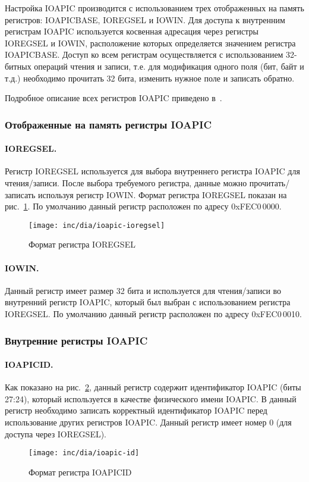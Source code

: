 Настройка IOAPIC производится с использованием трех отображенных на память регистров:
IOAPICBASE, IOREGSEL и IOWIN. Для доступа к внутренним регистрам IOAPIC используется косвенная
адресация через регистры IOREGSEL и IOWIN, расположение которых определяется значением
регистра IOAPICBASE. Доступ ко всем регистрам осуществляется с использованием 32-битных
операций чтения и записи, т.е. для модификация одного поля (бит, байт и т.д.) необходимо
прочитать 32 бита, изменить нужное поле и записать обратно.

Подробное описание всех регистров IOAPIC приведено в~\cite{ioapic}.

\subsubsection*{Отображенные на память регистры IOAPIC}
\paragraph{IOREGSEL.} Регистр IOREGSEL используется для выбора внутреннего регистра IOAPIC для чтения/записи.
После выбора требуемого регистра, данные можно прочитать/записать используя регистр IOWIN. Формат регистра
IOREGSEL показан на рис.~\ref{fig:ioapic-ioregsel}. По умолчанию данный регистр расположен по адресу 0xFEC0\,0000.
\begin{figure}[ht!]
  \centering
  \texttt{[image: inc/dia/ioapic-ioregsel]}
  \caption{Формат регистра IOREGSEL}
  \label{fig:ioapic-ioregsel}
\end{figure}

\paragraph{IOWIN.} Данный регистр имеет размер 32 бита и используется для чтения/записи во
внутренний регистр IOAPIC, который был выбран с использованием регистра IOREGSEL.
По умолчанию данный регистр расположен по адресу 0xFEC0\,0010.

\subsubsection*{Внутренние регистры IOAPIC}
\paragraph{IOAPICID.} Как показано на рис.~\ref{fig:ioapic-id}, данный регистр содержит идентификатор IOAPIC (биты 27:24),
который используется в качестве физического имени IOAPIC. В данный регистр необходимо записать корректный идентификатор
IOAPIC перед использование других регистров IOAPIC. Данный регистр имеет номер 0 (для доступа через IOREGSEL).
\begin{figure}[ht!]
  \centering
  \texttt{[image: inc/dia/ioapic-id]}
  \caption{Формат регистра IOAPICID}
  \label{fig:ioapic-id}
\end{figure}

